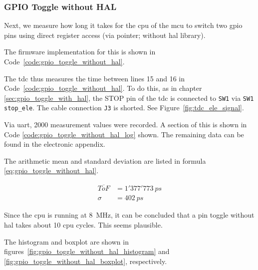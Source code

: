 \subsubsection{GPIO Toggle without HAL}\label{sec:gpio_toggle_without_hal}

Next, we measure how long it takes for the \acrshort{cpu} of the \acrshort{mcu} to switch two \acrshort{gpio} pins using direct register access
(via pointer; without \acrshort{hal} library).

The firmware implementation for this is shown in Code~\ref{code:gpio_toggle_without_hal}.



The \acrshort{tdc} thus measures the time between lines 15 and 16 in Code~\ref{code:gpio_toggle_without_hal}. To do this,
as in chapter \ref{sec:gpio_toggle_with_hal}, the STOP pin of the \acrshort{tdc} is connected to \lstinline|SW1| via \lstinline|SW1|
\lstinline|stop_ele|. The cable connection \lstinline|J3| is shorted. See
Figure~\ref{fig:tdc_ele_signal}.

Via \acrshort{uart}, 2000 measurement values were recorded. A section of this is shown in Code
\ref{code:gpio_toggle_without_hal_log} shown. The remaining data can be found in the electronic appendix.



The arithmetic mean and standard deviation are listed in formula \ref{eq:gpio_toggle_without_hal}.

\begin{equation}\label{eq:gpio_toggle_without_hal}
      \begin{split}
            \overline{ToF} & = 1'377'773~ps \\
            \sigma         & = 402~ps
      \end{split}
\end{equation}

Since the \acrshort{cpu} is running at 8~MHz, it can be concluded that a pin toggle without \acrshort{hal} takes about 10
\acrshort{cpu} cycles. This seems plausible.

The histogram and boxplot are shown in figures~\ref{fig:gpio_toggle_without_hal_histogram} and
\ref{fig:gpio_toggle_without_hal_boxplot}, respectively.

